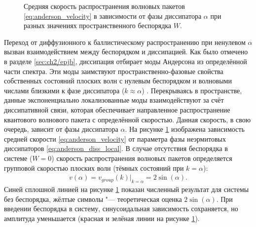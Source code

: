 \begin{figure}[h]
	\caption[Скорость распространения волновых пакетов в зависимости от параметров неэрмитовой диссипации]{
		Средняя скорость распространения волновых пакетов \cref{eq:anderson_velocity} в зависимости от фазы диссипатора \(\alpha\) при разных значениях пространственного беспорядка \(W\).
	}
	\label{fig:anderson_prb_4}
\end{figure}

Переход от диффузионного к баллистическому распространению при ненулевом \(\alpha\) вызван взаимодействием между беспорядком и диссипацией. 
Как было отмечено в разделе \cref{sec:ch2/epjb}, диссипация отбирает моды Андерсона из определённой части спектра. 
Эти моды заимствуют пространственно-фазовые свойства собственных состояний плоских волн с нулевым беспорядком и волновыми числами близкими к фазе диссипатора (\(k\approx \alpha\)) \cite{Vershinina2017, Ishii1973}. 
Перекрываясь в пространстве, данные экспоненциально локализованные моды взаимодействуют за счёт диссипативной связи, которая обеспечивает направленное распространение квантового волнового пакета с определённой скоростью. 
Данная скорость, в свою очередь, зависит от фазы диссипатора \(\alpha\). 
На рисунке \cref{fig:anderson_prb_4} изображена зависимость средней скорости \cref{eq:anderson_velocity} от параметра фазы неэрмитовых диссипаторов \cref{eq:anderson_diss_local}. В случае отсутствия беспорядка в системе (\(W=0\)) скорость распространения волновых пакетов определяется групповой скоростью плоских волн (тёмных состояний при \(k=\alpha\)):
\begin{equation}
	\label{eq:anderson_velocity_sin}
	\begin{gathered}
		v(\alpha) = v_{group}(k)|_{k=\alpha} = 2 \sin(\alpha) .
	\end{gathered}
\end{equation}
Синей сплошной линией на рисунке \cref{fig:anderson_prb_4} показан численный результат для системы без беспорядка, жёлтые символы "--- теоретическая оценка \(2 \sin(\alpha)\). 
При введении беспорядка в систему, синусоидальная зависимость сохраняется, но амплитуда уменьшается (красная и зелёная линии на рисунке \cref{fig:anderson_prb_4}).

